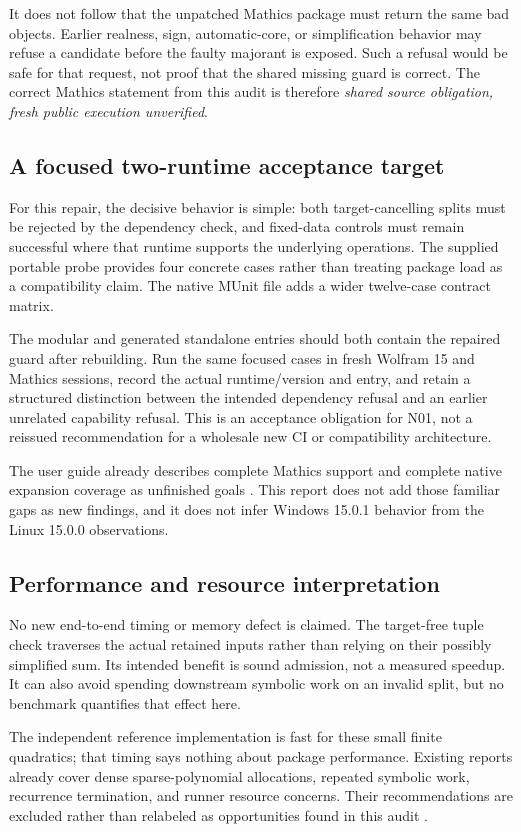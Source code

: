 \documentclass[11pt,letterpaper]{article}
\theoremstyle{remark}\newtheorem{remark}[theorem]{Remark}
\begin{document}
It does not follow that the unpatched Mathics package must return the same bad
objects. Earlier realness, sign, automatic-core, or simplification behavior
may refuse a candidate before the faulty majorant is exposed. Such a refusal
would be safe for that request, not proof that the shared missing guard is
correct. The correct Mathics statement from this audit is therefore
\emph{shared source obligation, fresh public execution unverified}.

\subsection{A focused two-runtime acceptance target}
For this repair, the decisive behavior is simple: both target-cancelling splits
must be rejected by the dependency check, and fixed-data controls must remain
successful where that runtime supports the underlying operations. The supplied
portable probe provides four concrete cases rather than treating package load
as a compatibility claim. The native MUnit file adds a wider twelve-case
contract matrix.

The modular and generated standalone entries should both contain the repaired
guard after rebuilding. Run the same focused cases in fresh Wolfram 15 and
Mathics sessions, record the actual runtime/version and entry, and retain a
structured distinction between the intended dependency refusal and an earlier
unrelated capability refusal. This is an acceptance obligation for N01, not a
reissued recommendation for a wholesale new CI or compatibility architecture.

The user guide already describes complete Mathics support and complete native
expansion coverage as unfinished goals \cite{guide}. This report does not add
those familiar gaps as new findings, and it does not infer Windows 15.0.1
behavior from the Linux 15.0.0 observations.

\subsection{Performance and resource interpretation}
No new end-to-end timing or memory defect is claimed. The target-free tuple
check traverses the actual retained inputs rather than relying on their
possibly simplified sum. Its intended benefit is sound admission, not a
measured speedup. It can also avoid spending downstream symbolic work on an
invalid split, but no benchmark quantifies that effect here.

The independent reference implementation is fast for these small finite
quadratics; that timing says nothing about package performance. Existing
reports already cover dense sparse-polynomial allocations, repeated symbolic
work, recurrence termination, and runner resource concerns. Their
recommendations are excluded rather than relabeled as opportunities found in
this audit \cite{register,wave4,wave6}.
\end{document}
